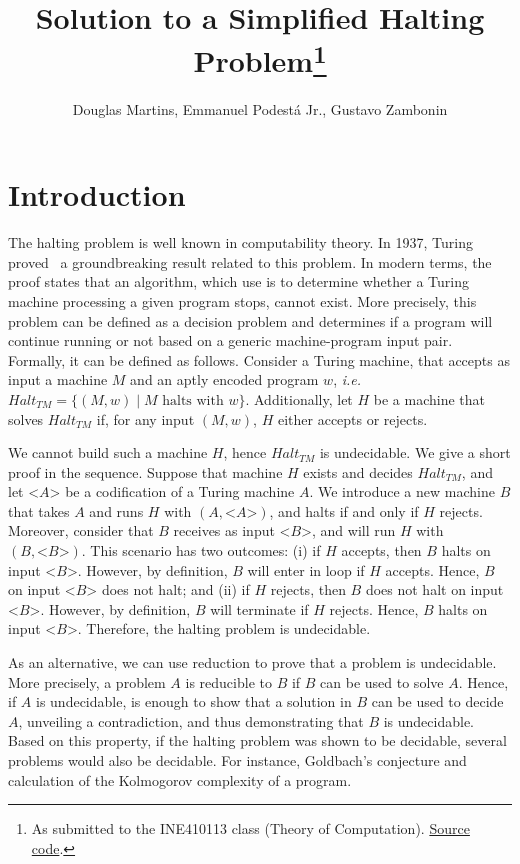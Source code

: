 \documentclass[12pt]{article}
\title{Solution to a Simplified Halting Problem\footnote{
    As submitted to the INE410113 class (Theory of Computation). \href{https://github.com/zambonin/ine410113}{Source code}.}}
\author{Douglas Martins\inst{1}, Emmanuel Podestá Jr.\inst{1}, Gustavo Zambonin\inst{1}}
\begin{document}
 

\maketitle

\section{Introduction}\label{sec:intro}

The halting problem is well known in computability theory. In 1937, Turing proved~\cite{Turing:article:1937:jan} a groundbreaking result related to this problem. In modern terms, the proof states that an algorithm, which use is to determine whether a Turing machine processing a given program stops, cannot exist. More precisely, this problem can be defined as a decision problem and determines if a program will continue running or not based on a generic machine-program input pair. Formally, it can be defined as follows. Consider a Turing machine, that accepts as input a machine $M$ and an aptly encoded program $w$, \emph{i.e.} $Halt_{TM} = \{(M, w) \mid M \text{ halts with } w\}$. Additionally, let $H$ be a machine that solves $Halt_{TM}$ if, for any input $(M, w)$, $H$ either accepts or rejects. 

We cannot build such a machine $H$, hence $Halt_{TM}$ is undecidable. We give a short proof in the sequence. Suppose that machine $H$ exists and decides $Halt_{TM}$, and let <$A$> be a codification of a Turing machine $A$. We introduce a new machine $B$ that takes $A$ and runs $H$ with $(A, \text{<}A\text{>})$, and halts if and only if $H$ rejects. Moreover, consider that $B$ receives as input <$B$>, and will run $H$ with $(B, \text{<}B\text{>})$. This scenario has two outcomes: (i) if $H$ accepts, then $B$ halts on input <$B$>. However, by definition, $B$ will enter in loop if $H$ accepts. Hence, $B$ on input <$B$> does not halt; and (ii) if $H$ rejects, then $B$ does not halt on input <$B$>. However, by definition, $B$ will terminate if $H$ rejects. Hence, $B$ halts on input <$B$>. Therefore, the halting problem is undecidable.

As an alternative, we can use reduction to prove that a problem is undecidable. More precisely, a problem $A$ is reducible to $B$ if $B$ can be used to solve $A$. Hence, if $A$ is undecidable, is enough to show that a solution in $B$ can be used to decide $A$, unveiling a contradiction, and thus demonstrating that $B$ is undecidable. Based on this property, if the halting problem was shown to be decidable, several problems would also be decidable. For instance, Goldbach's conjecture and calculation of the Kolmogorov complexity of a program.
\end{document}
